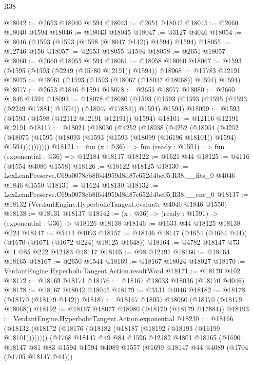 \begin{lexlean}{R38}
\begin{coremodule}
@18042 := @2653 @18040 @1594
@18043 := @2651 @18042
@18045 := @2660 @18040 @1594
@18046 := @18043 @18045
@18047 := @3127 @4046
@18054 := @18046 (@1593 (@1593 (@1598 (@18047 @142)) @1594) @1594)
@18055 := @12746 @156
@18057 := @2653 @18055 @1594
@18058 := @2651 @18057
@18060 := @2660 @18055 @1594
@18061 := @18058 @18060
@18067 := @1593 (@1595 (@1593 (@2249 (@15780 @12191)) @1594))
@18068 := @15783 @12191
@18075 := @18061 (@1593 (@1593 (@18067 (@18047 @18068)) @1594) @1594)
@18077 := @2653 @1846 @1594
@18078 := @2651 @18077
@18080 := @2660 @1846 @1594
@18093 := @18078
    @18080
    (@1593 (@1593 (@1593 (@1595 (@1593 (@2249 @17881) @1594)) (@18047 @17884)) @1594) @1594)
@18099 := @1593 (@1593 (@1598 (@12112 @12191 @12191)) @1594)
@18101 := @12116 @12191 @12191
@18117 := @18021
    (@18030
      (@4252
        (@18038
          (@4252
            (@18054
              (@4252
                (@18075 (@1595 (@18093 (@1593 (@1593 (@18099 (@16196 @18101)) @1594) @1594))))))))))
@18121 := fun (x : @36) => fun (ready : @1591) => fun (exponential : @36) => @12184 @18117
@18122 := @1621 @44
@18125 := @4116 (@1554 @4086 @1558)
@18126 := @18122 @18125
@18130 := LexLeanPreserve.C69a0078cb8f644959d8d87c652d4be05.R38.__fits_0 @4046 @1846 @1550
@18131 := @1624 @18130
@18132 := LexLeanPreserve.C69a0078cb8f644959d8d87c652d4be05.R38.__enc_0
@18137 := @18132 (VerdantEngine.HyperbolicTangent.evaluate @4046 @1846 @1550)
@18138 := @18131 @18137
@18142 := (x : @36) -> (ready : @1591) -> (exponential : @36) -> @18126 @18138
@18146 := @1633 @44 @18125 @18138 @224
@18147 := @5411 @4093
@18157 := @18146 @18147 (@1654 (@1664 @44)) (@1670 (@1671 (@1672 @224) @18125 @1648))
@18164 := @4782 @18147 @73 @11 @85 @222 @12183 @18117
@18165 := @98 @12191
@18166 := @18164 @18165
@18167 := @2650 @1544
@18169 := @18167 @18024 @18027
@18170 := VerdantEngine.HyperbolicTangent.Action.resultWord
@18171 := @18170 @102
@18172 := @18169 @18171
@18176 := @18167 @18033 @18036 (@18170 @4046)
@18178 := @18167 @18042 @18045
@18179 := @3131 @4046
@18182 := @18178 (@18170 (@18179 @142))
@18187 := @18167 @18057 @18060 (@18170 (@18179 @18068))
@18192 := @18167 @18077 @18080 (@18170 (@18179 @17884))
@18193 := VerdantEngine.HyperbolicTangent.Action.exponential
@18230 := @18166
    (@18132 (@18172 (@18176 (@18182 (@18187 (@18192 (@18193 (@16199 @18101))))))))
    (@1768
      @18147
      @49
      @84
      @1596
      @12182
      @4801
      @18165
      (@1690
        @18147
        @81
        @83
        @1594
        @1594
        @4089
        @1557
        (@1699 @18147 @44 @4089 (@1704 (@1705 @18147 @44)))

\end{coremodule}
\end{lexlean}
